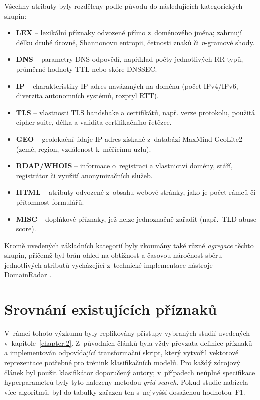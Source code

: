 \noindent Všechny atributy byly rozděleny podle původu do následujících
kategorických skupin:

\begin{itemize}
  \item \textbf{LEX} – lexikální příznaky odvozené přímo
        z~doménového jména; zahrnují délku druhé úrovně,
        Shannonovu entropii, četnosti znaků či \textit{n}-gramové
        shody.
  \item \textbf{DNS} – parametry DNS odpovědí, například počty
        jednotlivých RR typů, průměrné hodnoty TTL
        nebo skóre DNSSEC.
  \item \textbf{IP} – charakteristiky IP adres navázaných na doménu
        (počet IPv4/IPv6, diverzita autonomních systémů,
        rozptyl RTT).
  \item \textbf{TLS} – vlastnosti TLS handshake a certifikátů,
        např. verze protokolu, použitá cipher-suite,
        délka a validita certifikačního řetězce.
  \item \textbf{GEO} – geolokační údaje IP adres získané
        z~databází MaxMind GeoLite2 (země, region,
        vzdálenost k~měřícímu uzlu).
  \item \textbf{RDAP/WHOIS} – informace o~registraci a vlastnictví
        domény, stáří, registrátor či využití anonymizačních služeb.
  \item \textbf{HTML} – atributy odvozené z~obsahu webové stránky,
        jako je počet rámců či přítomnost formulářů.
  \item \textbf{MISC} – doplňkové příznaky, jež nelze jednoznačně
        zařadit (např.~TLD abuse score).
\end{itemize}
\label{item:segment}

\noindent Kromě uvedených základních kategorií byly zkoumány také různé \emph{agregace} těchto skupin, přičemž byl brán ohled na obtížnost a časovou náročnost sběru jednotlivých atributů vycházející z~technické implementace nástroje DomainRadar \cite{domainradar}.


\section{Srovnání existujících příznaků}
\label{sec:feature-survey}

V~rámci tohoto výzkumu byly replikovány přístupy vybraných studií uvedených v~kapitole~\ref{chapter:2}.  
Z~původních článků byla vždy převzata definice příznaků a implementován odpovídající transformační skript, který vytvořil vektorové reprezentace potřebné pro trénink klasifikačních modelů.  
Pro každý zdrojový článek byl použit klasifikátor doporučený autory; v~případech neúplné specifikace hyperparametrů byly tyto nalezeny metodou \emph{grid-search}.  
Pokud studie nabízela více algoritmů, byl do tabulky zařazen ten s~nejvyšší dosaženou hodnotou~F1.

